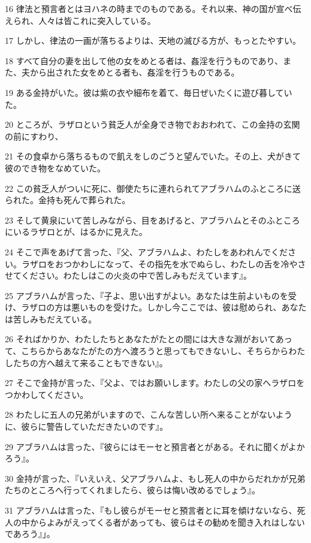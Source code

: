 \par 16 律法と預言者とはヨハネの時までのものである。それ以来、神の国が宣べ伝えられ、人々は皆これに突入している。
\par 17 しかし、律法の一画が落ちるよりは、天地の滅びる方が、もっとたやすい。
\par 18 すべて自分の妻を出して他の女をめとる者は、姦淫を行うものであり、また、夫から出された女をめとる者も、姦淫を行うものである。
\par 19 ある金持がいた。彼は紫の衣や細布を着て、毎日ぜいたくに遊び暮していた。
\par 20 ところが、ラザロという貧乏人が全身でき物でおおわれて、この金持の玄関の前にすわり、
\par 21 その食卓から落ちるもので飢えをしのごうと望んでいた。その上、犬がきて彼のでき物をなめていた。
\par 22 この貧乏人がついに死に、御使たちに連れられてアブラハムのふところに送られた。金持も死んで葬られた。
\par 23 そして黄泉にいて苦しみながら、目をあげると、アブラハムとそのふところにいるラザロとが、はるかに見えた。
\par 24 そこで声をあげて言った、『父、アブラハムよ、わたしをあわれんでください。ラザロをおつかわしになって、その指先を水でぬらし、わたしの舌を冷やさせてください。わたしはこの火炎の中で苦しみもだえています』。
\par 25 アブラハムが言った、『子よ、思い出すがよい。あなたは生前よいものを受け、ラザロの方は悪いものを受けた。しかし今ここでは、彼は慰められ、あなたは苦しみもだえている。
\par 26 そればかりか、わたしたちとあなたがたとの間には大きな淵がおいてあって、こちらからあなたがたの方へ渡ろうと思ってもできないし、そちらからわたしたちの方へ越えて来ることもできない』。
\par 27 そこで金持が言った、『父よ、ではお願いします。わたしの父の家へラザロをつかわしてください。
\par 28 わたしに五人の兄弟がいますので、こんな苦しい所へ来ることがないように、彼らに警告していただきたいのです』。
\par 29 アブラハムは言った、『彼らにはモーセと預言者とがある。それに聞くがよかろう』。
\par 30 金持が言った、『いえいえ、父アブラハムよ、もし死人の中からだれかが兄弟たちのところへ行ってくれましたら、彼らは悔い改めるでしょう』。
\par 31 アブラハムは言った、『もし彼らがモーセと預言者とに耳を傾けないなら、死人の中からよみがえってくる者があっても、彼らはその勧めを聞き入れはしないであろう』」。

